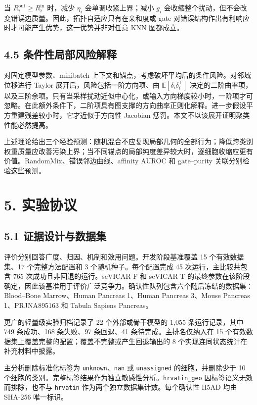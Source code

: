 \documentclass[journal]{IEEEtran}
\begin{document}
当 $R_i^{\mathrm{out}}\ge R_i^{\mathrm{in}}$ 时，减少 $\eta_i$ 会单调收紧上界；减小 $g_i$ 会收缩整个扰动，但不会改变错误边质量。因此，拓扑自适应只有在亲和度或 gate 对错误结构作出有利响应时才可能产生优势，这一优势并非对任意 KNN 图都成立。

\subsection{4.5 条件性局部风险解释}

对固定模型参数、minibatch 上下文和锚点，考虑破坏平均后的条件风险。对邻域位移进行 Taylor 展开后，风险包括一阶方向项、由 $\mathbb E[\delta_i\delta_i^\top]$ 决定的二阶曲率项，以及三阶余项。只有当采样扰动近似中心化，或输入方向梯度较小时，一阶项才可忽略。在此额外条件下，二阶项具有图支撑的方向曲率正则化解释。进一步假设平方重建残差较小时，它才近似于方向性 Jacobian 惩罚。本文不以该展开证明聚类性能必然提高。

上述理论给出三个经验预测：随机混合不应复现局部几何的全部行为；降低跨类别权重质量应改善污染上界；当不同锚点的局部纯度差异较大时，逐细胞收缩应更有价值。RandomMix、错误邻边曲线、affinity AUROC 和 gate–purity 关联分别检验这些预测。

\section{5. 实验协议}

\subsection{5.1 证据设计与数据集}

评价分别回答广度、归因、机制和效用问题。开发阶段基准覆盖 15 个有效数据集、17 个完整方法配置和 3 个随机种子。每个配置完成 45 次运行，主比较共包含 765 次成功且非回退的运行。scVICAR-F 和 scVICAR-T 的最终参数在该阶段确定，因此该基准用于评价广泛竞争力。确认性队列包含六个随后冻结的数据集：Blood–Bone Marrow、Human Pancreas 1、Human Pancreas 3、Mouse Pancreas 1、PRJNA895163 和 Tabula Sapiens Pancreas。

更广的轻量级实验归档记录了 22 个外部或骨干模型的 1,055 条运行记录，其中 749 条成功、168 条失败、97 条回退、41 条待完成。主排名仅纳入在 15 个有效数据集上覆盖完整的配置；覆盖不完整或产生回退输出的 8 个实现连同状态统计在补充材料中披露。

主分析删除标准化标签为 \texttt{unknown}、\texttt{nan} 或 \texttt{unassigned} 的细胞，并删除少于 10 个细胞的类别。完整标签结果作为独立敏感性分析。\texttt{hrvatin\_geo} 因标签语义无效而排除，也不与 \texttt{hrvatin} 作为两个独立数据集计数。每个确认性 H5AD 均由 SHA-256 唯一标识。
\end{document}
